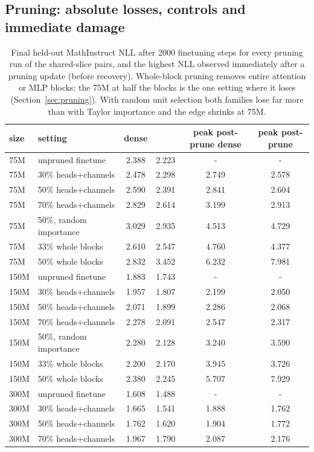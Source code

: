 \subsection{Pruning: absolute losses, controls and immediate damage}
\label{app:prune}
\begin{table}[h]\centering\footnotesize\setlength{\tabcolsep}{2.5pt}
\begin{tabular}{llcccc}\toprule
size & setting & dense & \dagf{} & peak post-prune dense & peak post-prune \dagf{} \\\midrule
75M & unpruned finetune & 2.388 & 2.223 & - & - \\
75M & 30\% heads+channels & 2.478 & 2.298 & 2.749 & 2.578 \\
75M & 50\% heads+channels & 2.590 & 2.391 & 2.841 & 2.604 \\
75M & 70\% heads+channels & 2.829 & 2.614 & 3.199 & 2.913 \\
75M & 50\%, random importance & 3.029 & 2.935 & 4.513 & 4.729 \\
75M & 33\% whole blocks & 2.610 & 2.547 & 4.760 & 4.377 \\
75M & 50\% whole blocks & 2.832 & 3.452 & 6.232 & 7.981 \\
150M & unpruned finetune & 1.883 & 1.743 & - & - \\
150M & 30\% heads+channels & 1.957 & 1.807 & 2.199 & 2.050 \\
150M & 50\% heads+channels & 2.071 & 1.899 & 2.286 & 2.068 \\
150M & 70\% heads+channels & 2.278 & 2.091 & 2.547 & 2.317 \\
150M & 50\%, random importance & 2.280 & 2.128 & 3.240 & 3.590 \\
150M & 33\% whole blocks & 2.200 & 2.170 & 3.945 & 3.726 \\
150M & 50\% whole blocks & 2.380 & 2.245 & 5.707 & 7.929 \\
300M & unpruned finetune & 1.608 & 1.488 & - & - \\
300M & 30\% heads+channels & 1.665 & 1.541 & 1.888 & 1.762 \\
300M & 50\% heads+channels & 1.762 & 1.620 & 1.904 & 1.772 \\
300M & 70\% heads+channels & 1.967 & 1.790 & 2.087 & 2.176 \\
\bottomrule\end{tabular}
\caption{Final held-out MathInstruct NLL after 2000 finetuning steps for every pruning run of the shared-slice pairs, and the highest NLL observed immediately after a pruning update (before recovery). Whole-block pruning removes entire attention or MLP blocks; the 75M \dagf{} at half the blocks is the one setting where it loses (Section~\ref{sec:pruning}). With random unit selection both families lose far more than with Taylor importance and the \dagf{} edge shrinks at 75M.}
\label{tab:prune_all}\end{table}

